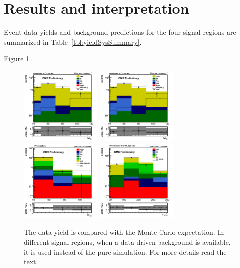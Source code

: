 \section{Results and interpretation}
\label{sect:stat}
Event data yields and background predictions for the four signal regions are summarized in Table~\ref{tbl:yieldSysSummary}.

Figure \ref{fig:yield_final}
\begin{figure}[!Hhtb]
\centering
\includegraphics[width=0.35\textwidth,keepaspectratio=true]{StatisticsFig/MT2_tauMTgt200_DDFake.png}
\includegraphics[width=0.35\textwidth,keepaspectratio=true]{StatisticsFig/MT2_tauMTgt200_DDFake.png}
\includegraphics[width=0.35\textwidth,keepaspectratio=true]{StatisticsFig/QCDWestimation_plot.png}
\includegraphics[width=0.35\textwidth,keepaspectratio=true]{StatisticsFig/QCDestimation_plot.png}
\caption{The data yield is compared with the Monte Carlo expectation. In different signal regions, 
when a data driven background is available, it is used instead of the pure simulation. For more details read the text.}
\label{fig:yield_final}
\end{figure}
